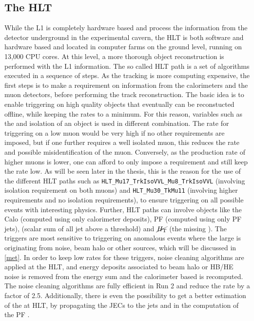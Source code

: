 \subsection{The HLT}
While the L1 is completely hardware based and process the information from the detector underground in the experimental cavern, the HLT is both software and hardware based and located in computer farms on the ground level, running on 13,000 CPU cores. 
At this level, a more thorough object reconstruction is performed with the L1 information. The so called HLT path is a set of algorithms executed in a sequence of steps. 
As the tracking is more computing expensive, the first steps is to make a requirement on information from the calorimeters and the muon detectors, before performing the track reconstruction. 
The basic idea is to enable triggering on high quality objects that eventually can be reconstucted offline, while keeping the rates to a minimum. 
For this reason, variables such as the \pt and isolation of an object is used in different combination. 
The rate for triggering on a low \pt muon would be very high if no other requirements are imposed, but if one further requires a well isolated muon, this reduces the rate and possible misidentification of the muon. 
Conversely, as the production rate of higher \pt muons is lower, one can afford to only impose a \pt requirement and still keep the rate low.   
As will be seen later in the thesis, this is the reason for the use of the different HLT paths such as \texttt{HLT\_Mu17\_TrkIsoVVL\_Mu8\_TrkIsoVVL} (involving isolation requirement on both muons) and \texttt{HLT\_Mu30\_TkMu11} (involving higher \pt requirements and no isolation requirements), to ensure triggering on all possible events with interesting physics.
Further, HLT paths can involve objects like the Calo \ptmiss (computed using only calorimeter deposits), PF \ptmiss (computed using only PF jets), \HT (scalar sum of all jet \pt above a threshold) and $\cancel{H_{\mathrm{T}}}$ (the missing \HT). 
The \ptmiss triggers are most sensitive to triggering on anomalous events where the large \ptmiss is originating from noise, beam halo or other sources, which will be discussed in \ref{met}. 
In order to keep low rates for these triggers, noise cleaning algorithms are applied at the HLT, and energy deposits associated to beam halo or HB/HE noise is removed from the energy sum and the calorimeter based \ptmiss is recomputed. 
The noise cleaning algorithms are fully efficient in Run 2 and reduce the rate by a factor of 2.5. 
Additionally, there is even the possibility to get a better estimation of the \ptmiss at HLT, by propagating the JECs to the jets and in the computation of the PF \ptmiss. 
